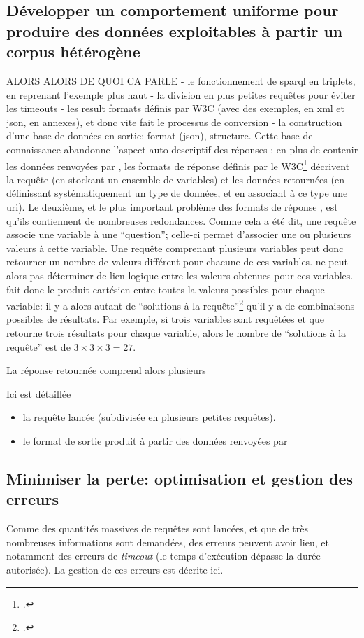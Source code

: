 \subsection{Développer un comportement uniforme pour produire des données exploitables à partir un corpus hétérogène}
ALORS ALORS DE QUOI CA PARLE
- le fonctionnement de sparql en triplets, en reprenant l'exemple plus haut
- la division en plus petites requêtes pour éviter les timeouts
- les result formats définis par W3C (avec des exemples, en xml et json, en annexes), et donc vite fait le processus de conversion
- la construction d'une base de données en sortie: format (json), structure. Cette base de connaissance abandonne l'aspect auto-descriptif des réponses \sparql{}: en plus de contenir les données renvoyées par \sparql{}, les formats de réponse définis par le W3C\footcite{beckett_sparql_2013} décrivent la requête (en stockant un ensemble de variables) et les données retournées (en définissant systématiquement un type de données, et en associant à ce type une \gls{uri}). Le deuxième, et le plus important problème des formats de réponse \sparql{}, est qu'ils contiennent de nombreuses redondances. Comme cela a été dit, une requête \sparql{} associe une variable à une \enquote{question}; celle-ci permet d'associer une ou plusieurs valeurs à cette variable. Une requête comprenant plusieurs variables peut donc retourner un nombre de valeurs différent pour chacune de ces variables. \sparql{} ne peut alors pas déterminer de lien logique entre les valeurs obtenues pour ces variables. \sparql{} fait donc le produit cartésien entre toutes la valeurs possibles pour chaque variable: il y a alors autant de \enquote{solutions à la requête}\footcite[§2.3.1. Variable Binding Results]{beckett_sparql_2013} qu'il y a de combinaisons possibles de résultats. Par exemple, si trois variables sont requêtées et que \sparql{} retourne trois résultats pour chaque variable, alors le nombre de \enquote{solutions à la requête} est de \(3 \times 3 \times 3 = 27\).

La réponse retournée comprend alors plusieurs 

Ici est détaillée 
\begin{itemize}
	\item la requête \sparql{} lancée (subdivisée en plusieurs petites requêtes).
	\item le format de sortie produit à partir des données renvoyées par \sparql
\end{itemize}

\subsection{Minimiser la perte: optimisation et gestion des erreurs}
Comme des quantités massives de requêtes sont lancées, et que de très nombreuses informations sont demandées, des erreurs peuvent avoir lieu, et notamment des erreurs de \textit{timeout} (le temps d'exécution dépasse la durée autorisée). La gestion de ces erreurs est décrite ici.

